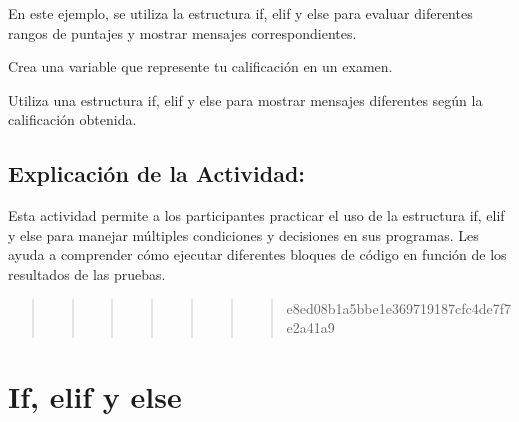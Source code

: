 \documentclass[
  a4paper,
  onepage,
  openany]{scrreprt}
\begin{document}
En este ejemplo, se utiliza la estructura if, elif y else para evaluar
diferentes rangos de puntajes y mostrar mensajes correspondientes.

\begin{tcolorbox}[enhanced jigsaw, breakable, opacityback=0, toptitle=1mm, coltitle=black, toprule=.15mm, rightrule=.15mm, colframe=quarto-callout-important-color-frame, opacitybacktitle=0.6, arc=.35mm, title=\textcolor{quarto-callout-important-color}{\faExclamation}\hspace{0.5em}{Actividad Práctica:}, titlerule=0mm, colbacktitle=quarto-callout-important-color!10!white, bottomtitle=1mm, bottomrule=.15mm, colback=white, left=2mm, leftrule=.75mm]

Crea una variable que represente tu calificación en un examen.

Utiliza una estructura if, elif y else para mostrar mensajes diferentes
según la calificación obtenida.

\end{tcolorbox}

\hypertarget{explicaciuxf3n-de-la-actividad-29}{%
\section{Explicación de la
Actividad:}\label{explicaciuxf3n-de-la-actividad-29}}

Esta actividad permite a los participantes practicar el uso de la
estructura if, elif y else para manejar múltiples condiciones y
decisiones en sus programas. Les ayuda a comprender cómo ejecutar
diferentes bloques de código en función de los resultados de las
pruebas.

\begin{quote}
\begin{quote}
\begin{quote}
\begin{quote}
\begin{quote}
\begin{quote}
\begin{quote}
e8ed08b1a5bbe1e369719187cfc4de7f7e2a41a9
\end{quote}
\end{quote}
\end{quote}
\end{quote}
\end{quote}
\end{quote}
\end{quote}

\hypertarget{if-elif-y-else}{%
\chapter{If, elif y else}\label{if-elif-y-else}}
\end{document}
